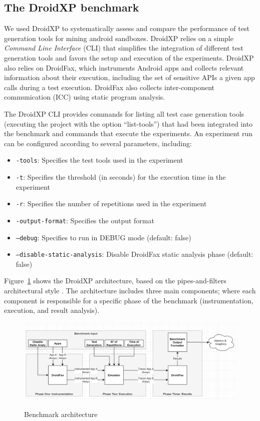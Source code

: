 \subsection{The DroidXP benchmark}\label{sec:droidxp}

We used DroidXP to systematically assess and compare the performance of test generation tools for mining android sandboxes. DroidXP relies on a
simple \emph{Command Line Interface} (CLI) that simplifies the integration of different test generation tools and favors the setup and execution 
of the experiments. DroidXP also relies on DroidFax, which instruments Android apps and collects relevant information about
their execution, including the set of sensitive APIs a given
app calls during a test execution. DroidFax also collects inter-component communication (ICC) using  static
program analysis.


The DroidXP CLI provides commands for listing all test case
generation tools (executing the project with the option ``list-tools'') that had been
integrated into the benchmark and commands that execute the experiments. An
experiment run can be configured according to several parameters, including:

\begin{itemize}
    \item \texttt{-tools}: Specifies the test tools used in the experiment
    \item \texttt{-t}: Specifies the threshold (in seconds) for the execution time in the experiment
    \item \texttt{-r}: Specifies the number of repetitions used in the experiment
    \item \texttt{-output-format}: Specifies the output format
    \item \texttt{--debug}: Specifies to run in DEBUG mode (default: false)
    \item \texttt{--disable-static-analysis}: Disable DroidFax static analysis phase (default: false)
\end{itemize}

Figure~\ref{fig:benchArq} shows the DroidXP architecture, based on the pipes-and-filters architectural style \cite{architecture-book}. 
The architecture includes three main components; where each component is responsible for a specific phase of the
benchmark (instrumentation, execution, and result analysis).

\begin{figure}[thb]
  \includegraphics[width=1\textwidth]{images/benchmark4.png}
  \label{benchArq}
  \caption{Benchmark architecture}
  \label{fig:benchArq}
\end{figure}
